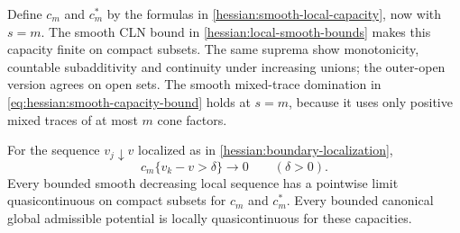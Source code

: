 Define $c_m$ and $c_m^*$ by the formulas in
\cref{hessian:smooth-local-capacity}, now with $s=m$.
The smooth CLN bound in \cref{hessian:local-smooth-bounds} makes
this capacity finite on compact subsets. The same suprema show
monotonicity, countable subadditivity and continuity under increasing
unions; the outer-open version agrees on open sets.
The smooth mixed-trace domination in
\eqref{eq:hessian:smooth-capacity-bound} holds at $s=m$, because
it uses only positive mixed traces of at most $m$ cone factors.

\begin{proposition}\label{draft623:top-capacity-convergence}
For the sequence $v_j\downarrow v$ localized as in
\cref{hessian:boundary-localization},
\[
 c_m\{v_k-v>\delta\}\longrightarrow0\qquad(\delta>0).
\]
Every bounded smooth decreasing local sequence has a pointwise limit
quasicontinuous on compact subsets for $c_m$ and $c_m^*$.
Every bounded canonical global admissible potential is locally
quasicontinuous for these capacities.
\end{proposition}
